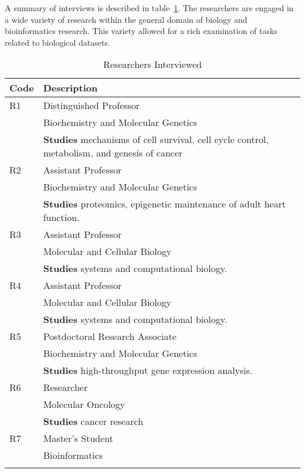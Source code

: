\documentclass[twocolumn]{bmcart}%
\begin{document}
A summary of interviews is described in table~\ref{table:interviews}.
The researchers are engaged in a wide variety of research within the general domain of biology and bioinformatics research. This variety allowed for a rich examination of tasks related to biological datasets.

\begin{table}[!ht]
 \caption{Researchers Interviewed}
 \begin{center}
   \begin{tabular}{p{0.5cm}p{5cm}}
     Code & Description \\
   \hline
     R1 & Distinguished Professor \\
        & Biochemistry and Molecular Genetics \\
        & \textbf{Studies} mechanisms of cell survival, cell cycle control, metabolism, and genesis of cancer
     \\ \cline{1-2} %
     R2 & Assistant Professor \\
        & Biochemistry and Molecular Genetics \\
        & \textbf{Studies} proteomics, epigenetic maintenance of adult heart function.
     \\ \cline{1-2} %
     R3
     & Assistant Professor \\
     & Molecular and Cellular Biology \\
     & \textbf{Studies} systems and computational biology.
     \\ \cline{1-2} %
     R4
     & Assistant Professor \\
     & Molecular and Cellular Biology \\
     & \textbf{Studies} systems and computational biology.
     \\ \cline{1-2} %
     R5
     & Postdoctoral Research Associate \\
     & Biochemistry and Molecular Genetics \\
     & \textbf{Studies} high-throughput gene expression analysis.
     \\ \cline{1-2} %
     R6
     & Researcher \\
     & Molecular Oncology \\
     & \textbf{Studies} cancer research
     \\ \cline{1-2} %
     R7
     & Master's Student \\
     & Bioinformatics
     \\ %
    \label{table:interviews}
   \end{tabular}
 \end{center}
\end{table}
\end{document}
